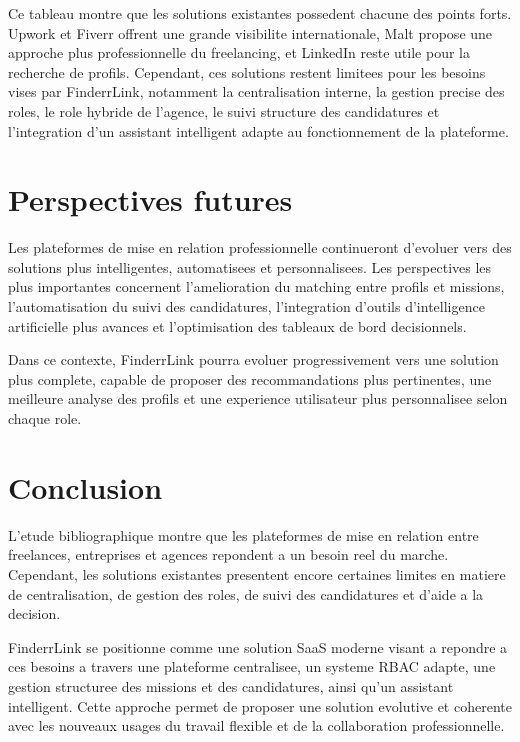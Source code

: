 Ce tableau montre que les solutions existantes possedent chacune des points forts. Upwork et Fiverr offrent une grande visibilite internationale, Malt propose une approche plus professionnelle du freelancing, et LinkedIn reste utile pour la recherche de profils. Cependant, ces solutions restent limitees pour les besoins vises par FinderrLink, notamment la centralisation interne, la gestion precise des roles, le role hybride de l'agence, le suivi structure des candidatures et l'integration d'un assistant intelligent adapte au fonctionnement de la plateforme.
\section{Perspectives futures}

Les plateformes de mise en relation professionnelle continueront d'evoluer vers des solutions plus intelligentes, automatisees et personnalisees. Les perspectives les plus importantes concernent l'amelioration du matching entre profils et missions, l'automatisation du suivi des candidatures, l'integration d'outils d'intelligence artificielle plus avances et l'optimisation des tableaux de bord decisionnels.

Dans ce contexte, FinderrLink pourra evoluer progressivement vers une solution plus complete, capable de proposer des recommandations plus pertinentes, une meilleure analyse des profils et une experience utilisateur plus personnalisee selon chaque role.

\section{Conclusion}

L'etude bibliographique montre que les plateformes de mise en relation entre freelances, entreprises et agences repondent a un besoin reel du marche. Cependant, les solutions existantes presentent encore certaines limites en matiere de centralisation, de gestion des roles, de suivi des candidatures et d'aide a la decision.

FinderrLink se positionne comme une solution SaaS moderne visant a repondre a ces besoins a travers une plateforme centralisee, un systeme RBAC adapte, une gestion structuree des missions et des candidatures, ainsi qu'un assistant intelligent. Cette approche permet de proposer une solution evolutive et coherente avec les nouveaux usages du travail flexible et de la collaboration professionnelle.
